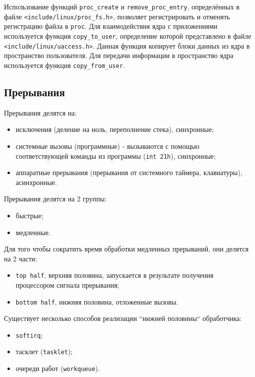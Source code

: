 Использование функций \texttt{proc\_create} и \texttt{remove\_proc\_entry}, определённых в файле \texttt{<include/linux/proc\_fs.h>}, позволяет регистрировать и отменять регистрацию файла в \texttt{proc}. Для взаимодействия ядра с приложениями используется функция \texttt{copy\_to\_user}, определение которой представлено в файле \texttt{<include/linux/uaccess.h>}. Данная функция копирует блоки данных из ядра в пространство пользователя. Для передачи информации в пространство ядра используется функция \texttt{copy\_from\_user}.

\subsection{Прерывания}

Прерывания делятся на:
\begin{itemize}
	\item исключения (деление на ноль, переполнение стека), синхронные;
	\item системные вызовы (программные) - вызываются с помощью соответствующей команды из программы (\texttt{int 21h}), синхронные;
	\item аппаратные прерывания (прерывания от системного таймера, клавиатуры), асинхронные. 
\end{itemize}

Прерывания делятся на 2 группы:

\begin{itemize}
	\item быстрые;
	\item медленные. 
\end{itemize}

Для того чтобы сократить время обработки медленных прерываний, они делятся на 2 части:

\begin{itemize}
	\item \texttt{top half}, верхняя половина, запускается в результате получения процессором сигнала прерывания;
	\item \texttt{bottom half}, нижняя половина, отложенные вызовы.
\end{itemize}

Существует несколько способов реализации “нижней половины“
обработчика: 
\begin{itemize}
	\item \texttt{softirq};
	\item тасклет (\texttt{tasklet});
	\item очереди работ (\texttt{workqueue}).
\end{itemize}
